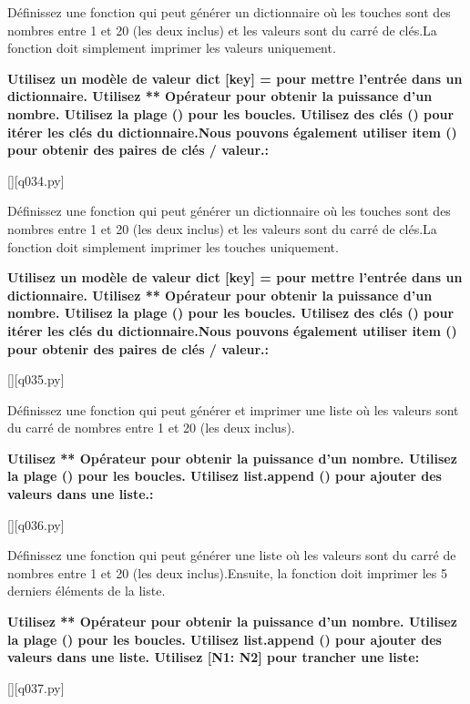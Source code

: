 \question
Définissez une fonction qui peut générer un dictionnaire où les touches sont des nombres entre 1 et 20 (les deux inclus) et les valeurs sont du carré de clés.La fonction doit simplement imprimer les valeurs uniquement.
\par
\textbf{Utilisez un modèle de valeur dict [key] = pour mettre l'entrée dans un dictionnaire.
Utilisez ** Opérateur pour obtenir la puissance d'un nombre.
Utilisez la plage () pour les boucles.
Utilisez des clés () pour itérer les clés du dictionnaire.Nous pouvons également utiliser item () pour obtenir des paires de clés / valeur.:}
\renewcommand{\nomfichier}{q034.py}
\begin{solution}
    \pythonfile{\chemincode \nomfichier}[][q034.py]
\end{solution}


\question
Définissez une fonction qui peut générer un dictionnaire où les touches sont des nombres entre 1 et 20 (les deux inclus) et les valeurs sont du carré de clés.La fonction doit simplement imprimer les touches uniquement.
\par
\textbf{Utilisez un modèle de valeur dict [key] = pour mettre l'entrée dans un dictionnaire.
Utilisez ** Opérateur pour obtenir la puissance d'un nombre.
Utilisez la plage () pour les boucles.
Utilisez des clés () pour itérer les clés du dictionnaire.Nous pouvons également utiliser item () pour obtenir des paires de clés / valeur.:}
\renewcommand{\nomfichier}{q035.py}
\begin{solution}
    \pythonfile{\chemincode \nomfichier}[][q035.py]
\end{solution}


\question
Définissez une fonction qui peut générer et imprimer une liste où les valeurs sont du carré de nombres entre 1 et 20 (les deux inclus).
\par
\textbf{Utilisez ** Opérateur pour obtenir la puissance d'un nombre.
Utilisez la plage () pour les boucles.
Utilisez list.append () pour ajouter des valeurs dans une liste.:}
\renewcommand{\nomfichier}{q036.py}
\begin{solution}
    \pythonfile{\chemincode \nomfichier}[][q036.py]
\end{solution}


\question
Définissez une fonction qui peut générer une liste où les valeurs sont du carré de nombres entre 1 et 20 (les deux inclus).Ensuite, la fonction doit imprimer les 5 derniers éléments de la liste.
\par
\textbf{Utilisez ** Opérateur pour obtenir la puissance d'un nombre.
Utilisez la plage () pour les boucles.
Utilisez list.append () pour ajouter des valeurs dans une liste.
Utilisez [N1: N2] pour trancher une liste:}
\renewcommand{\nomfichier}{q037.py}
\begin{solution}
    \pythonfile{\chemincode \nomfichier}[][q037.py]
\end{solution}


